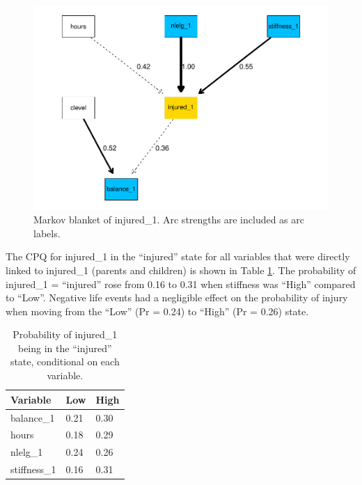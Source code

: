 \documentclass[man,floatsintext]{apa6}
\begin{document}
\begin{figure}
\centering
\includegraphics{figs/study1figs/node1-1.pdf}
\caption{\label{fig:node1}Markov blanket of injured\_1. Arc strengths are included as arc labels.}
\end{figure}

The CPQ for injured\_1 in the \enquote{injured} state for all variables that were directly linked to injured\_1 (parents and children) is shown in Table \ref{tab:query1}.
The probability of injured\_1 = \enquote{injured} rose from 0.16 to 0.31 when stiffness was \enquote{High} compared to \enquote{Low}.
Negative life events had a negligible effect on the probability of injury when moving from the \enquote{Low} (Pr = 0.24) to \enquote{High} (Pr = 0.26) state.

\begin{table}[H]

\begin{center}
\begin{threeparttable}

\caption{\label{tab:query1}Probability of injured\_1 being in the ``injured'' state, conditional on each variable.}

\begin{tabular}{lll}
\toprule
Variable & Low & High\\
\midrule
balance\_1 & 0.21 & 0.30\\
hours & 0.18 & 0.29\\
nlelg\_1 & 0.24 & 0.26\\
stiffness\_1 & 0.16 & 0.31\\
\bottomrule
\end{tabular}

\end{threeparttable}
\end{center}

\end{table}
\end{document}
